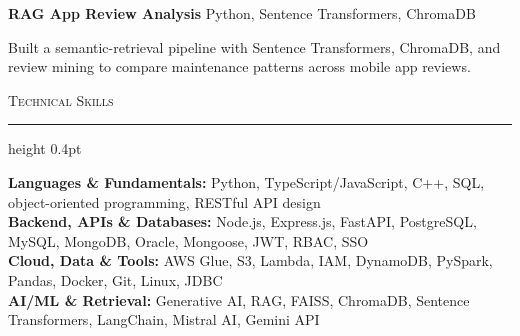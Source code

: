 \documentclass[letterpaper,11pt]{article}
\newcommand{\resumesection}[1]{%
  \par\vspace{2pt}%
  {\large\scshape #1}\par\vspace{2pt}%
  \hrule height 0.4pt\vspace{2pt}%
}
\newcommand{\projectHeading}[2]{
  \textbf{#1} \hfill #2
}
\begin{document}
\projectHeading{RAG App Review Analysis}{Python, Sentence Transformers, ChromaDB}
\begin{tightitemize}
  \item Built a semantic-retrieval pipeline with Sentence Transformers, ChromaDB, and review mining to compare maintenance patterns across mobile app reviews.
\end{tightitemize}

\resumesection{Technical Skills}
\textbf{Languages \& Fundamentals:} Python, TypeScript/JavaScript, C++, SQL, object-oriented programming, RESTful API design\\
\textbf{Backend, APIs \& Databases:} Node.js, Express.js, FastAPI, PostgreSQL, MySQL, MongoDB, Oracle, Mongoose, JWT, RBAC, SSO\\
\textbf{Cloud, Data \& Tools:} AWS Glue, S3, Lambda, IAM, DynamoDB, PySpark, Pandas, Docker, Git, Linux, JDBC\\
\textbf{AI/ML \& Retrieval:} Generative AI, RAG, FAISS, ChromaDB, Sentence Transformers, LangChain, Mistral AI, Gemini API
\end{document}
